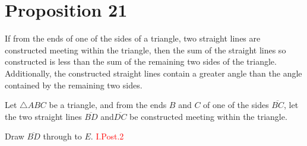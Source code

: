 
\section*{Proposition 21}

\begin{thm}
If from the ends of one of the sides of a triangle, two straight lines are constructed meeting within the triangle, then the sum of the straight lines so constructed is less than the sum of the remaining two sides of the triangle. Additionally, the constructed straight lines contain a greater angle than the angle contained by the remaining two sides.
\end{thm}

\begin{figure}[H]
	\caption{}
\end{figure}

Let $\triangle{ABC}$ be a triangle, and from the ends $B$ and $C$ of one of the sides $\overline{BC}$, let the two straight lines $\overline{BD}$ and$ \overline{DC}$ be constructed meeting within the triangle.

Draw $\overline{BD}$ through to $E$. \hfill\textcolor{red}{I.Post.2}

\begin{figure}[H]
	\caption{}
\end{figure}

\clearpage

